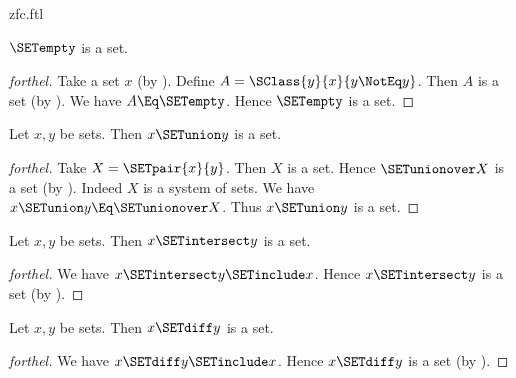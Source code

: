 \documentclass{stex}
\begin{document}
\begin{smodule}{zfc.ftl}

\begin{proposition}[forthel]
  $\SETempty$ is a set.
\end{proposition}
\begin{proof}[forthel]
  Take a set $x$ (by ).
  Define $A = \SClass{y}{x}{y \NotEq y}$.
  Then $A$ is a set (by ).
  We have $A \Eq \SETempty$.
  Hence $\SETempty$ is a set.
\end{proof}

\begin{proposition}[forthel]
  Let $x, y$ be sets.
  Then $x \SETunion y$ is a set.
\end{proposition}
\begin{proof}[forthel]
  Take $X = \SETpair{x}{y}$.
  Then $X$ is a set.
  Hence $\SETunionover X$ is a set (by ).
  Indeed $X$ is a system of sets.
  We have $x \SETunion y \Eq \SETunionover X$.
  Thus $x \SETunion y$ is a set.
\end{proof}

\begin{proposition}[forthel]
  Let $x, y$ be sets.
  Then $x \SETintersect y$ is a set.
\end{proposition}
\begin{proof}[forthel]
  We have $x \SETintersect y \SETinclude x$.
  Hence $x \SETintersect y$ is a set (by ).
\end{proof}

\begin{proposition}[forthel]
  Let $x, y$ be sets.
  Then $x \SETdiff y$ is a set.
\end{proposition}
\begin{proof}[forthel]
  We have $x \SETdiff y \SETinclude x$.
  Hence $x \SETdiff y$ is a set (by ).
\end{proof}


\end{smodule}
\end{document}
